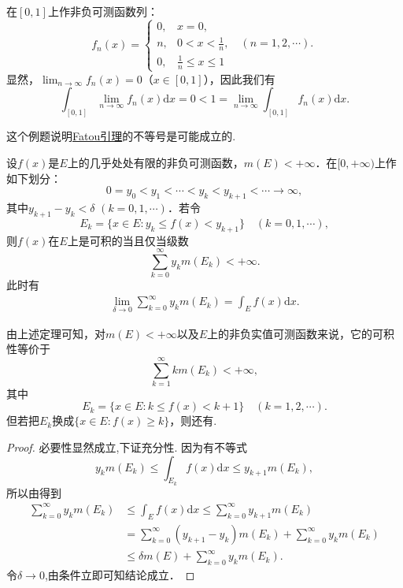 \documentclass[../../main.tex]{subfiles}
\begin{document}
\begin{example}\label{example:Fatou引理不等号成立的例子}
在\([0, 1]\)上作非负可测函数列：
\[
f_n(x)=
\begin{cases}
0, & x = 0, \\
n, & 0 < x < \frac{1}{n}, \quad (n = 1, 2, \cdots). \\
0, & \frac{1}{n} \leqslant x \leqslant 1
\end{cases}
\]
显然，\(\lim_{n \to \infty} f_n(x) = 0\)（\(x \in [0, 1]\)），因此我们有
\[
\int_{[0, 1]} \lim_{n \to \infty} f_n(x) \mathrm{d}x = 0 < 1 = \lim_{n \to \infty} \int_{[0, 1]} f_n(x) \mathrm{d}x.
\] 
\end{example}
\begin{note}
这个例题说明\hyperref[lemma:Fatou引理]{Fatou引理}的不等号是可能成立的.
\end{note}

\begin{theorem}\label{theorem:函数可积的充要条件1}
设\(f(x)\)是\(E\)上的几乎处处有限的非负可测函数，\(m(E) < +\infty\)．在\([0, +\infty)\)上作如下划分：
\[
0 = y_0 < y_1 < \cdots < y_k < y_{k + 1} < \cdots \to \infty,
\]
其中\(y_{k + 1} - y_k < \delta\) \((k = 0, 1, \cdots)\)．若令
\[
E_k = \{x \in E: y_k \leqslant f(x) < y_{k + 1}\} \quad (k = 0, 1, \cdots),
\]
则\(f(x)\)在\(E\)上是可积的当且仅当级数
\[
\sum_{k = 0}^{\infty} y_k m(E_k) < +\infty.
\]
此时有
\begin{align*}
\lim_{\delta \to 0} \sum_{k = 0}^{\infty} y_k m(E_k) = \int_E f(x) \mathrm{d}x.
\end{align*}
\end{theorem}
\begin{note}
由上述定理可知，对\(m(E) < +\infty\)以及\(E\)上的非负实值可测函数来说，它的可积性等价于
\[
\sum_{k = 1}^{\infty} k m(E_k) < +\infty,
\]
其中
\[
E_k = \{x \in E: k \leqslant f(x) < k + 1\} \quad (k = 1, 2, \cdots).
\]
但若把\(E_k\)换成\(\{x \in E: f(x) \geqslant k\}\)，则还有.
\end{note}
\begin{proof}
必要性显然成立,下证充分性.
因为有不等式
\[
y_k m(E_k) \leqslant \int_{E_k} f(x) \mathrm{d}x \leqslant y_{k + 1} m(E_k),
\]
所以由得到
\begin{align*}
\sum_{k = 0}^{\infty} y_k m(E_k) &\leqslant \int_E f(x) \mathrm{d}x \leqslant \sum_{k = 0}^{\infty} y_{k + 1} m(E_k) \\
&= \sum_{k = 0}^{\infty} (y_{k + 1} - y_k) m(E_k) + \sum_{k = 0}^{\infty} y_k m(E_k) \\
&\leqslant \delta m(E) + \sum_{k = 0}^{\infty} y_k m(E_k).
\end{align*}
令$\delta \to 0$,由条件立即可知结论成立．
\end{proof}
\end{document}
